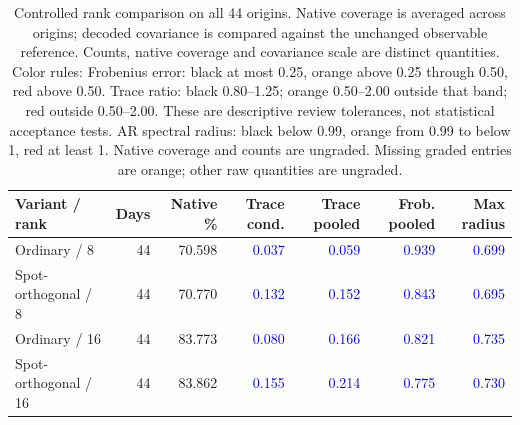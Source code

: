 \documentclass[11pt]{article}
\begin{document}
\begin{table}[H]\centering\small\setlength{\tabcolsep}{4pt}
\caption{Controlled rank comparison on all 44 origins. Native coverage is averaged across origins; decoded covariance is compared against the unchanged observable reference. Counts, native coverage and covariance scale are distinct quantities. Color rules: Frobenius error: black at most 0.25, orange above 0.25 through 0.50, red above 0.50. Trace ratio: black 0.80--1.25; orange 0.50--2.00 outside that band; red outside 0.50--2.00. These are descriptive review tolerances, not statistical acceptance tests. AR spectral radius: black below 0.99, orange from 0.99 to below 1, red at least 1. Native coverage and counts are ungraded. Missing graded entries are orange; other raw quantities are ungraded.}\label{tab:rank-comparison}
\begin{tabular}{@{}lrrrrrr@{}}
\toprule
Variant / rank & Days & Native \% & Trace cond. & Trace pooled & Frob. pooled & Max radius \\
\midrule
Ordinary / 8 & 44 & 70.598 & \textcolor{blue}{0.037} & \textcolor{blue}{0.059} & \textcolor{blue}{0.939} & \textcolor{blue}{0.699} \\
Spot-orthogonal / 8 & 44 & 70.770 & \textcolor{blue}{0.132} & \textcolor{blue}{0.152} & \textcolor{blue}{0.843} & \textcolor{blue}{0.695} \\
Ordinary / 16 & 44 & 83.773 & \textcolor{blue}{0.080} & \textcolor{blue}{0.166} & \textcolor{blue}{0.821} & \textcolor{blue}{0.735} \\
Spot-orthogonal / 16 & 44 & 83.862 & \textcolor{blue}{0.155} & \textcolor{blue}{0.214} & \textcolor{blue}{0.775} & \textcolor{blue}{0.730} \\
\bottomrule\end{tabular}\end{table}
\end{document}
